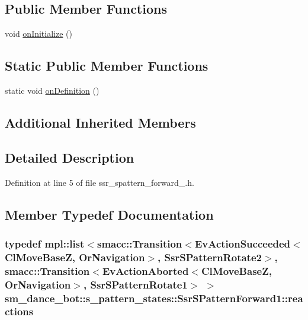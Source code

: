 \subsection*{Public Member Functions}
\begin{DoxyCompactItemize}
\item 
void \hyperlink{structsm__dance__bot_1_1s__pattern__states_1_1SsrSPatternForward1_a5cd2009ce0865f2e84f4ddff679a9a98}{on\+Initialize} ()
\end{DoxyCompactItemize}
\subsection*{Static Public Member Functions}
\begin{DoxyCompactItemize}
\item 
static void \hyperlink{structsm__dance__bot_1_1s__pattern__states_1_1SsrSPatternForward1_a946f32a88d7714cdbb6e13b8bd910d29}{on\+Definition} ()
\end{DoxyCompactItemize}
\subsection*{Additional Inherited Members}


\subsection{Detailed Description}


Definition at line 5 of file ssr\+\_\+spattern\+\_\+forward\+\_.\+h.



\subsection{Member Typedef Documentation}
\subsubsection[{\texorpdfstring{reactions}{reactions}}]{\setlength{\rightskip}{0pt plus 5cm}typedef mpl\+::list$<${\bf smacc\+::\+Transition}$<$Ev\+Action\+Succeeded$<${\bf Cl\+Move\+BaseZ}, {\bf Or\+Navigation}$>$, {\bf Ssr\+S\+Pattern\+Rotate2}$>$, {\bf smacc\+::\+Transition}$<$Ev\+Action\+Aborted$<${\bf Cl\+Move\+BaseZ}, {\bf Or\+Navigation}$>$, {\bf Ssr\+S\+Pattern\+Rotate1}$>$ $>$ {\bf sm\+\_\+dance\+\_\+bot\+::s\+\_\+pattern\+\_\+states\+::\+Ssr\+S\+Pattern\+Forward1\+::reactions}}\hypertarget{structsm__dance__bot_1_1s__pattern__states_1_1SsrSPatternForward1_ae643895286f2e6f4167ad5a4dac042d4}{}\label{structsm__dance__bot_1_1s__pattern__states_1_1SsrSPatternForward1_ae643895286f2e6f4167ad5a4dac042d4}


